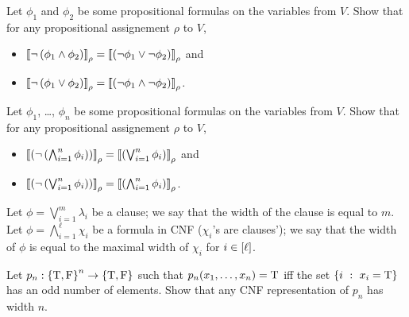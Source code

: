 \begin{chapterendexercises}
  \exercise %
    Let $\phi_1$ and $\phi_2$ be some propositional formulas on
    the variables from $V$. Show that for any propositional assignement
    $\rho$ to $V$,
    \begin{itemize}
      \item
        $\left\llbracket {
        \lnot\left(
          \phi_1 \land \phi_2
        \right)} \right\rrbracket_{\rho} =
        \left\llbracket {
          \left(
            \lnot \phi_1 \lor \lnot \phi_2
          \right)
         } \right\rrbracket_{\rho}$ and
    \item
    $\left\llbracket {
    \lnot\left(
      \phi_1 \lor \phi_2
    \right)} \right\rrbracket_{\rho} =
    \left\llbracket {
      \left(
        \lnot \phi_1 \land \lnot \phi_2
      \right)
     } \right\rrbracket_{\rho}$.
  \end{itemize}
  \exercise %
    Let $\phi_1$, \dots, $\phi_n$ be some propositional formulas on
    the variables from $V$. Show that for any propositional assignement
    $\rho$ to $V$,
    \begin{itemize}
      \item
        $\left\llbracket {
          \left(
            \lnot \left(
                    \bigwedge_{i = 1}^n \phi_i
                  \right)
          \right)} \right\rrbracket_{\rho} =
          \left\llbracket {
            \left(
              \bigvee_{i = 1}^n \phi_i
            \right)
           } \right\rrbracket_{\rho}$ and
      \item
        $\left\llbracket {
         \left(
           \lnot \left(
                   \bigvee_{i = 1}^n \phi_i
                 \right)
         \right)} \right\rrbracket_{\rho} =
         \left\llbracket {
           \left(
             \bigwedge_{i = 1}^n \phi_i
           \right)
          } \right\rrbracket_{\rho}$.
    \end{itemize}
  \exercise Let $\phi = \bigvee_{i = 1}^m \lambda_i$ be a clause; we say that
    the width of the clause is equal to $m$.
    Let $\phi = \bigwedge_{i = 1}^\ell \chi_i$ be a formula in CNF
    ($\chi_i$'s are clauses'); we say that the width of $\phi$ is equal to
    the maximal width of $\chi_i$ for $i \in {[{\ell}]}$.

    Let $p_n : \set{\ltrue, \lfalse}^n \to \set{\ltrue, \lfalse}$ such that
    $p_n(x_1, \dots, x_n) = \text{T}$
    iff the set $\set[x_i = \ltrue]{i}$ has an odd number of elements.
    Show that any CNF representation of $p_n$ has width $n$.
\end{chapterendexercises}
